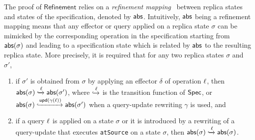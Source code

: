 The proof of $\mathsf{Refinement}$ relies on a \emph{refinement
  mapping}~\cite{AbadiL91,DBLP:journals/iandc/LynchV95} between replica states and states of the
specification, denoted by $\mathsf{abs}$. Intuitively, $\mathsf{abs}$ being a refinement mapping means that any
effector or query applied on a replica state $\sigma$ can be mimicked by the corresponding operation in the specification
starting from $\mathsf{abs}(\sigma)$ and leading to a specification state which is related by $\mathsf{abs}$ to the resulting
replica state.
More precisely, it is required that for 
any two replica states $\sigma$ and $\sigma'$,
\begin{enumerate}
\item if $\sigma'$ is obtained from $\sigma$ by applying an
  effector $\delta$ of operation $\ell$, then
  \mbox{$\mathsf{abs}(\sigma)\xhookrightarrow{\ensuremath{\ell}}\mathsf{abs}(\sigma')$},
  where $\xhookrightarrow{\ensuremath{\ell}}$ is the transition function of
  $\mathsf{Spec}$, or \mbox{$\mathsf{abs}(\sigma)\xhookrightarrow{\ensuremath{\mathsf{upd}}(\gamma(\ensuremath{\ell}))}\mathsf{abs}(\sigma')$} 
  when a query-update rewriting $\gamma$ is used,
  and
\item if a query $\ell$ is applied on a state $\sigma$ or
  it is introduced by a rewriting of a query-update that
  executes \lstinline|atSource| on a state $\sigma$, then
  $\mathsf{abs}(\sigma)\xhookrightarrow{\ensuremath{\ell}}\mathsf{abs}(\sigma)$.
\end{enumerate}


